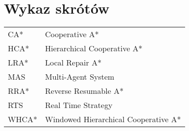 \chapter*{Wykaz skrótów}

\begin{tabular}{l l}
CA* & Cooperative A* \\
HCA* & Hierarchical Cooperative A* \\
LRA* & Local Repair A* \\
MAS & Multi-Agent System \\
RRA* & Reverse Resumable A* \\
RTS & Real Time Strategy \\
WHCA* & Windowed Hierarchical Cooperative A* \\

\end{tabular}
